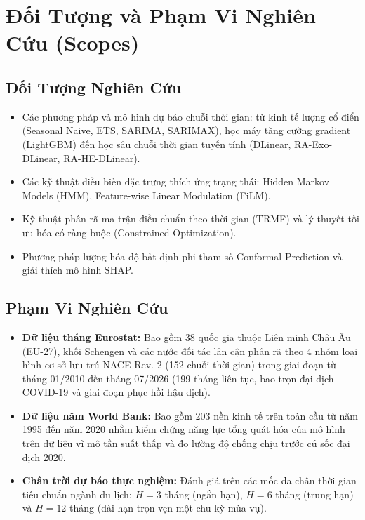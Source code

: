 \section{Đối Tượng và Phạm Vi Nghiên Cứu (Scopes)}
\label{sec:scope}

\subsection{Đối Tượng Nghiên Cứu}
\begin{itemize}
    \item Các phương pháp và mô hình dự báo chuỗi thời gian: từ kinh tế lượng cổ điển (Seasonal Naive, ETS, SARIMA, SARIMAX), học máy tăng cường gradient (LightGBM) đến học sâu chuỗi thời gian tuyến tính (DLinear, RA-Exo-DLinear, RA-HE-DLinear).
    \item Các kỹ thuật điều biến đặc trưng thích ứng trạng thái: Hidden Markov Models (HMM), Feature-wise Linear Modulation (FiLM).
    \item Kỹ thuật phân rã ma trận điều chuẩn theo thời gian (TRMF) và lý thuyết tối ưu hóa có ràng buộc (Constrained Optimization).
    \item Phương pháp lượng hóa độ bất định phi tham số Conformal Prediction và giải thích mô hình SHAP.
\end{itemize}

\subsection{Phạm Vi Nghiên Cứu}
\begin{itemize}
    \item \textbf{Dữ liệu tháng Eurostat:} Bao gồm 38 quốc gia thuộc Liên minh Châu Âu (EU-27), khối Schengen và các nước đối tác lân cận phân rã theo 4 nhóm loại hình cơ sở lưu trú NACE Rev. 2 (152 chuỗi thời gian) trong giai đoạn từ tháng 01/2010 đến tháng 07/2026 (199 tháng liên tục, bao trọn đại dịch COVID-19 và giai đoạn phục hồi hậu dịch).
    \item \textbf{Dữ liệu năm World Bank:} Bao gồm 203 nền kinh tế trên toàn cầu từ năm 1995 đến năm 2020 nhằm kiểm chứng năng lực tổng quát hóa của mô hình trên dữ liệu vĩ mô tần suất thấp và đo lường độ chống chịu trước cú sốc đại dịch 2020.
    \item \textbf{Chân trời dự báo thực nghiệm:} Đánh giá trên các mốc đa chân thời gian tiêu chuẩn ngành du lịch: $H=3$ tháng (ngắn hạn), $H=6$ tháng (trung hạn) và $H=12$ tháng (dài hạn trọn vẹn một chu kỳ mùa vụ).
\end{itemize}

